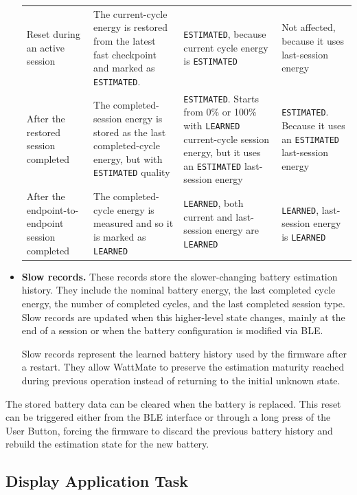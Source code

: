\begin{itemize}
\begin{table}[H]
\begin{tabularx}{\textwidth}{
				@{}
				>{\raggedright\arraybackslash}p{}
				>{\raggedright\arraybackslash}X
				>{\raggedright\arraybackslash}p{3.5cm}
				>{\raggedright\arraybackslash}p{3.5cm}
				@{}
			}
			Reset during an active session &
			The current-cycle energy is restored from the latest fast checkpoint and marked as \texttt{ESTIMATED}. & \texttt{ESTIMATED}, because current cycle energy is \texttt{ESTIMATED} &
			Not affected, because it uses last-session energy \\
			
			After the restored session completed &
			The completed-session energy is stored as the last completed-cycle energy, but with \texttt{ESTIMATED} quality &
			\texttt{ESTIMATED}. Starts from 0\% or 100\% with \texttt{LEARNED} current-cycle session energy, but it uses an \texttt{ESTIMATED} last-session energy &
			\texttt{ESTIMATED}. Because it uses an \texttt{ESTIMATED} last-session energy \\
			
			After the endpoint-to-endpoint session completed &
			The completed-cycle energy is measured and so it is marked as \texttt{LEARNED} &
			\texttt{LEARNED}, both current and last-session energy are \texttt{LEARNED} &
			\texttt{LEARNED}, last-session energy is \texttt{LEARNED}\\
			
			\bottomrule
		\end{tabularx}
	\end{table}
	
	
	\item \textbf{Slow records.}
	These records store the slower-changing battery estimation history. They include the nominal battery energy, the last completed cycle energy, the number of completed cycles, and the last completed session type. Slow records are updated when this higher-level state changes, mainly at the end of a session or when the battery configuration is modified via BLE.
	
	Slow records represent the learned battery history used by the firmware after a restart. They allow WattMate to preserve the estimation maturity reached during previous operation instead of returning to the initial unknown state.
\end{itemize}

The stored battery data can be cleared when the battery is replaced. This reset can be triggered either from the BLE interface or through a long press of the User Button, forcing the firmware to discard the previous battery history and rebuild the estimation state for the new battery.

\subsection{Display Application Task}

